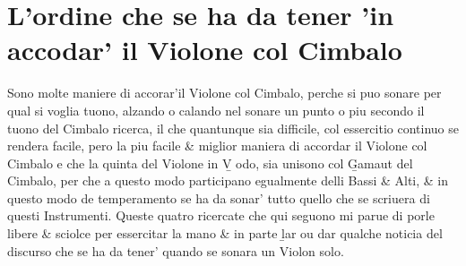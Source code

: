 \chapter{L'ordine che se ha da tener 'in accodar' il Violone col Cimbalo}
Sono molte maniere di accorar'il Violone col Cimbalo, perche si puo sonare per qual si voglia tuono, alzando o calando nel sonare un punto o piu secondo il tuono del Cimbalo ricerca, il che quantunque sia difficile, col essercitio continuo se rendera facile, pero la piu facile \& miglior maniera di accordar il Violone col Cimbalo e che la quinta del Violone in \b{V odo}, sia unisono col \b{Gamaut} del Cimbalo, per che a questo modo participano egualmente delli Bassi \& Alti, \& in questo modo de temperamento se ha da sonar' tutto quello che se scriuera di questi Instrumenti.
Queste quatro ricercate che qui seguono mi parue di porle libere \& sciolce per essercitar la mano \& in parte \b{lar ou dar} qualche noticia del discurso che se ha da tener' quando se sonara un Violon solo.
